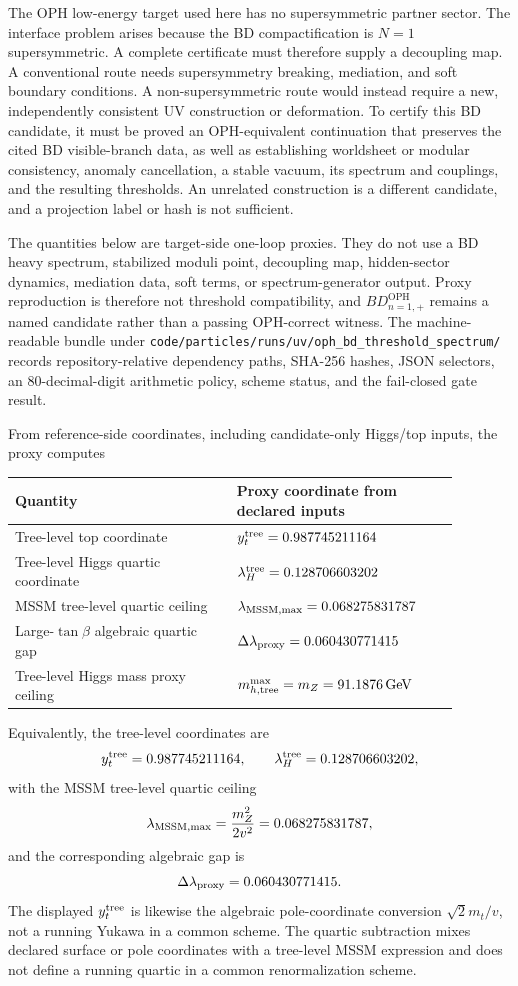 \documentclass[11pt]{article}
\theoremstyle{remark}
\theoremstyle{plain}
\newcommand{\OPH}{\mathrm{OPH}}
\begin{document}
The OPH low-energy target used here has no supersymmetric partner sector. The interface problem
arises because the BD compactification is \(N=1\) supersymmetric. A complete certificate must
therefore supply a decoupling map. A conventional route needs supersymmetry breaking, mediation,
and soft boundary conditions. A non-supersymmetric route would instead require a new,
independently consistent UV construction or deformation. To certify this BD candidate, it must be
proved an OPH-equivalent continuation that preserves the cited BD visible-branch data, as well as
establishing worldsheet or modular consistency, anomaly cancellation, a stable vacuum, its
spectrum and couplings, and the resulting thresholds. An unrelated construction is a different
candidate, and a projection label or hash is not sufficient.

The quantities below are target-side one-loop proxies. They do not use a BD heavy spectrum,
stabilized moduli point, decoupling map, hidden-sector dynamics, mediation data, soft terms, or
spectrum-generator output. Proxy reproduction is therefore not threshold compatibility, and
\(BD_{n=1,+}^{\OPH}\) remains a named candidate rather than a passing OPH-correct witness. The
machine-readable bundle under
\texttt{code/particles/runs/uv/oph\_bd\_threshold\_spectrum/} records repository-relative
dependency paths, SHA-256 hashes, JSON selectors, an 80-decimal-digit arithmetic policy, scheme
status, and the fail-closed gate result.

From reference-side coordinates, including candidate-only Higgs/top inputs, the proxy computes
\begin{longtable}{p{0.44\linewidth}p{0.44\linewidth}}
\toprule
\textbf{Quantity} & \textbf{Proxy coordinate from declared inputs} \\
\midrule
Tree-level top coordinate & \(y_t^{\rm tree}=0.987745211164\) \\
Tree-level Higgs quartic coordinate & \(\lambda_H^{\rm tree}=0.128706603202\) \\
MSSM tree-level quartic ceiling & \(\lambda_{\rm MSSM,max}=0.068275831787\) \\
Large-\(\tan\beta\) algebraic quartic gap & \(\Delta\lambda_{\rm proxy}=0.060430771415\) \\
Tree-level Higgs mass proxy ceiling & \(m_{h,\rm tree}^{\rm max}=m_Z=91.1876\,\mathrm{GeV}\) \\
\bottomrule
\end{longtable}

Equivalently, the tree-level coordinates are
\[
y_t^{\rm tree}=0.987745211164,
\qquad
\lambda_H^{\rm tree}=0.128706603202,
\]
with the MSSM tree-level quartic ceiling
\[
\lambda_{\rm MSSM,max}=\frac{m_Z^2}{2v^2}=0.068275831787,
\]
and the corresponding algebraic gap is
\[
\Delta\lambda_{\rm proxy}=0.060430771415.
\]
The displayed \(y_t^{\rm tree}\) is likewise the algebraic pole-coordinate conversion
\(\sqrt2m_t/v\), not a running Yukawa in a common scheme. The quartic subtraction mixes declared
surface or pole coordinates with a tree-level MSSM expression and does not define a running
quartic in a common renormalization scheme.
\end{document}
